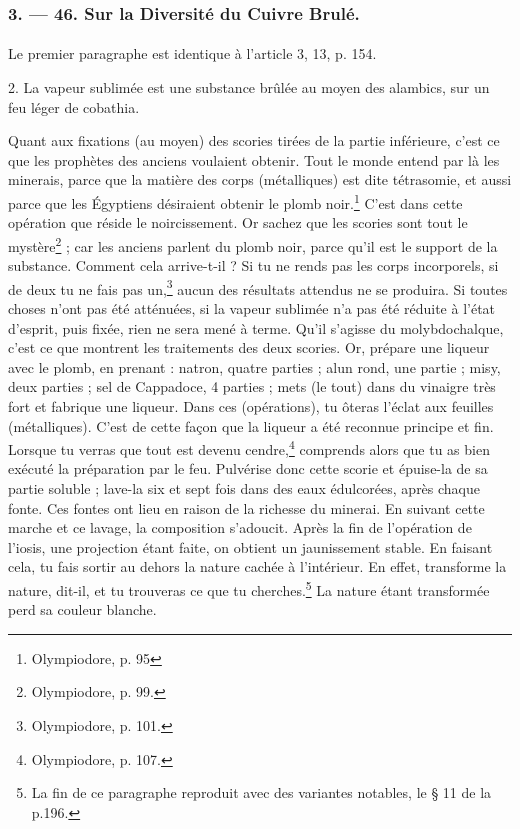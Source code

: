\documentclass[landscape, a4paper, 11pt, oneside, polutonikogreek, french]{article}
\begin{document}
\subsubsection{3. --- 46. Sur la Diversité du Cuivre Brulé.}
\paragraph{}
Le premier paragraphe est identique à l'article 3, 13, p. 154.

2. La vapeur sublimée est une substance brûlée au moyen des alambics, sur un feu léger de cobathia.

Quant aux fixations (au moyen) des scories tirées de la partie inférieure, c'est ce que les prophètes des anciens voulaient obtenir. Tout le monde entend par là les minerais, parce que la matière des corps (métalliques) est dite tétrasomie, et aussi parce que les Égyptiens désiraient obtenir le plomb noir.\footnote{Olympiodore, p. 95} C'est dans cette opération que réside le noircissement. Or sachez que les scories sont tout le mystère\footnote{Olympiodore, p. 99.} ; car les anciens parlent du plomb noir, parce qu'il est le support de la substance. Comment cela arrive-t-il ? Si tu ne rends pas les corps incorporels, si de deux tu ne fais pas un,\footnote{Olympiodore, p. 101.} aucun des résultats attendus ne se produira. Si toutes choses n'ont pas été atténuées, si la vapeur sublimée n'a pas été réduite à l'état d'esprit, puis fixée, rien ne sera mené à terme. Qu'il s'agisse du molybdochalque, c'est ce que montrent les traitements des deux scories. Or, prépare une liqueur avec le plomb, en prenant : natron, quatre parties ; alun rond, une partie ; misy, deux parties ; sel de Cappadoce, 4 parties ; mets (le tout) dans du vinaigre très fort et fabrique une liqueur. Dans ces (opérations), tu ôteras l'éclat aux feuilles (métalliques). C'est de cette façon que la liqueur a été reconnue principe et fin. Lorsque tu verras que tout est devenu cendre,\footnote{Olympiodore, p. 107.} comprends alors que tu as bien exécuté la préparation par le feu. Pulvérise donc cette scorie et épuise-la de sa partie soluble ; lave-la six et sept fois dans des eaux édulcorées, après chaque fonte. Ces fontes ont lieu en raison de la richesse du minerai. En suivant cette marche et ce lavage, la composition s'adoucit. Après la fin de l'opération de l'iosis, une projection étant faite, on obtient un jaunissement stable. En faisant cela, tu fais sortir au dehors la nature cachée à l'intérieur. En effet, transforme la nature, dit-il, et tu trouveras ce que tu cherches.\footnote{La fin de ce paragraphe reproduit avec des variantes notables, le § 11 de la p.196.} La nature étant transformée perd sa couleur blanche.
\end{document}
